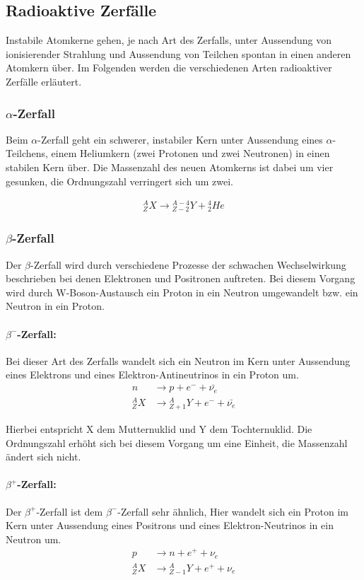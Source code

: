 \documentclass[12pt,listof=totoc]{scrartcl}
\begin{document}
\subsection{Radioaktive Zerfälle}
Instabile Atomkerne gehen, je nach Art des Zerfalls, unter Aussendung von ionisierender Strahlung und Aussendung von Teilchen spontan in einen anderen Atomkern über. Im Folgenden werden die verschiedenen Arten radioaktiver Zerfälle erläutert.
\subsubsection{$\alpha$-Zerfall}
Beim $\alpha$-Zerfall geht ein schwerer, instabiler Kern unter Aussendung eines $\alpha$-Teilchens, einem Heliumkern (zwei Protonen und zwei Neutronen) in einen stabilen Kern über. Die Massenzahl des neuen Atomkerns ist dabei um vier gesunken, die Ordnungszahl verringert sich um zwei.

\begin{align}
{}_Z^A X \rightarrow {}_{Z-2}^{A-4} Y + {}^4_2He
\end{align}

\subsubsection{$\beta$-Zerfall}
Der $\beta$-Zerfall wird durch verschiedene Prozesse der schwachen Wechselwirkung beschrieben bei denen Elektronen  und Positronen auftreten. Bei diesem Vorgang wird durch W-Boson-Austausch ein Proton in ein Neutron umgewandelt bzw. ein Neutron in ein Proton.

\paragraph*{$\beta^-$-Zerfall:} 
Bei dieser Art des Zerfalls wandelt sich ein Neutron im Kern unter Aussendung eines Elektrons und eines Elektron-Antineutrinos in ein Proton um. 
\begin{align*}
n &\rightarrow p + e^- + \bar{\nu_e}\\
{}_Z^A X &\rightarrow {}_{Z+1}^A Y + e^- + \bar{\nu_e}
\end{align*}

Hierbei entspricht X dem Mutternuklid und Y dem Tochternuklid. Die Ordnungszahl erhöht sich bei diesem Vorgang um eine Einheit, die Massenzahl ändert sich nicht.

\paragraph*{$\beta^+$-Zerfall:}
Der $\beta^+$-Zerfall ist dem $\beta^-$-Zerfall sehr ähnlich, Hier wandelt sich ein Proton im Kern unter Aussendung eines Positrons und eines Elektron-Neutrinos in ein Neutron um.
\begin{align*}
p &\rightarrow n + e^+ + \nu_e\\
{}_Z^A X &\rightarrow {}_{Z-1}^A Y + e^+ + \nu_e
\end{align*}
\end{document}

